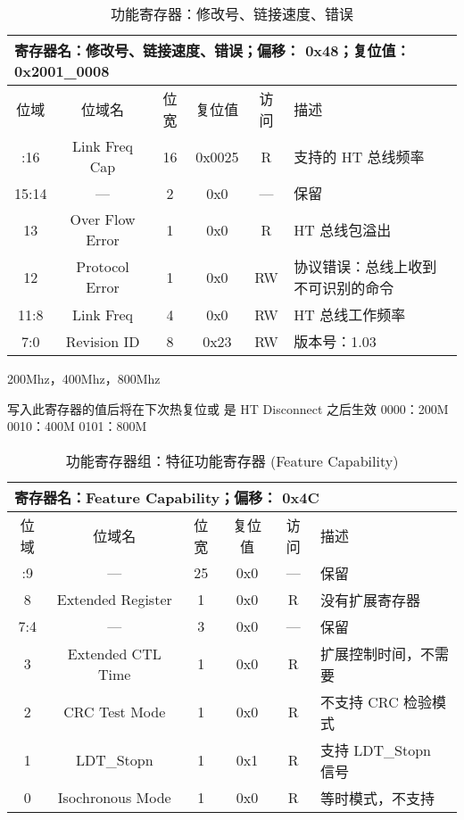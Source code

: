 \begin{table}[htbp]
  \centering
  \begin{tabular}{|c|c|c|c|c|p{6.5cm}|} \hline
    \multicolumn{6}{|l|}{寄存器名：修改号、链接速度、错误；偏移： 0x48；复位值：0x2001\_0008} \\ \hline
    位域  & 位域名          & 位宽 & 复位值 & 访问 & 描述 \\ \hhline
    31:16 & Link Freq Cap   & 16   & 0x0025 & R    & 支持的 HT 总线频率 \\
    15:14 & ---             & 2    & 0x0    & ---  & 保留 \\
    13    & Over Flow Error & 1    & 0x0    & R    & HT 总线包溢出 \\
    12    & Protocol Error  & 1    & 0x0    & RW  & 协议错误：总线上收到不可识别的命令 \\
    11:8  & Link Freq       & 4    & 0x0    & RW  & HT 总线工作频率 \\
    7:0   & Revision ID     & 8    & 0x23   & RW  & 版本号：1.03 \\ \hline
  \end{tabular}
  \caption{功能寄存器：修改号、链接速度、错误}
  \label{tab:capreg3}
\end{table}

200Mhz，400Mhz，800Mhz

写入此寄存器的值后将在下次热复位或 是 HT Disconnect 之后生效 0000：200M 0010：400M 0101：800M \\

\begin{table}[htbp]
  \centering
  \begin{tabular}{|c|c|c|c|c|p{6.5cm}|} \hline
    \multicolumn{6}{|l|}{寄存器名：Feature Capability；偏移： 0x4C} \\ \hline
    位域 & 位域名            & 位宽 & 复位值 & 访问 & 描述 \\ \hhline
    31:9 & ---               & 25 & 0x0 & --- & 保留 \\
    8    & Extended Register & 1  & 0x0 & R   & 没有扩展寄存器 \\
    7:4  & ---               & 3  & 0x0 & --- & 保留 \\
    3    & Extended CTL Time & 1  & 0x0 & R   & 扩展控制时间，不需要 \\
    2    & CRC Test Mode     & 1  & 0x0 & R   & 不支持 CRC 检验模式 \\
    1    & LDT\_Stopn        & 1  & 0x1 & R   & 支持 LDT\_Stopn 信号 \\
    0    & Isochronous Mode  & 1  & 0x0 & R   & 等时模式，不支持   \\ \hline
  \end{tabular}
  \caption{功能寄存器组：特征功能寄存器 (Feature Capability)}
  \label{tab:capreg4}
\end{table}

